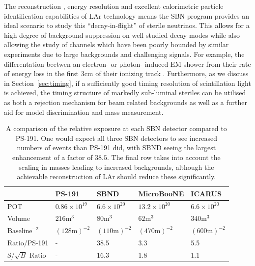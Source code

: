 \documentclass[11pt, a4paper]{article}
\newcommand{\refsec}[1]{Section~\ref{#1}}
\begin{document}
The reconstruction \cite{Church:2013hea, Marshall:2015rfa}, energy resolution
\cite{Sorel:2014rka} and excellent calorimetric particle identification
capabilities of LAr \cite{Antonello:2012hu} technology means the SBN program
provides an ideal scenario to study this ``decay-in-flight'' of sterile
neutrinos.  This allows for a high degree of background suppression on well
studied decay modes while also allowing the study of channels which have been
poorly bounded by similar experiments due to large backgrounds and challenging
signals. For example, the differentation beetwen an electron- or photon-
induced EM shower from their rate of energy loss in the first 3cm of their
ionizing track \cite{szelc:2007}.  Furthermore, as we discuss in
\refsec{sec:timing}, if a sufficiently good timing resolution of scintillation
light is achieved, the timing structure of markedly sub-luminal steriles
can be utilised as both a rejection mechanism for beam related backgrounds as
well as a further aid for model discrimination and mass measurement.

\begin{table}[t!]
\centering
\begin{tabular}{| l || l | l | l | l |}
	\hline
	& PS-191 & SBND & MicroBooNE & ICARUS \\ \hline \hline
	POT	& $0.86 \times 10^{19}$	& $6.6 \times 10^{20}$	&	$13.2 \times 10^{20}$     &  $6.6 \times 10^{20}$ \\ \hline
	Volume	& $216\text{m}^3$	&	$80\text{m}^3$	&	$62\text{m}^3$	     &   $340\text{m}^3$	\\ \hline
	$\text{Baseline}^{-2}$	& $(128 	\text{m} )^{-2}$	&$(110 \text{m} )^{-2}$	&	$(470 \text{m} )^{-2}$			     & $(600 \text{m} )^{-2}$	  \\ \hline
Ratio/PS-191 & - 	& 38.5 	& 3.3	& 5.5\\ \hline
	S/$\sqrt{B}$ Ratio & - 	& 16.3 	& 1.8	& 1.1\\ \hline
\end{tabular}

\caption{\label{tab:exposure} A comparison of the relative exposure at each SBN detector
compared to PS-191. One would expect all  three SBN detectors to see increased
numbers of events than PS-191 did, with SBND seeing the largest enhancement of a
factor of $38.5$. The final row takes into account the scaling in masses
leading to increased backgrounds, although the achievable reconstruction of LAr
should reduce these significantly.}

\end{table}
\end{document}
